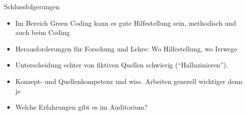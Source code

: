 \documentclass[10pt,aspectratio=169]{beamer}
\begin{document}
\begin{frame}{Schlussfolgerungen}
    \begin{itemize}
        \item Im Bereich Green Coding kann es gute Hilfestellung sein, methodisch und auch beim Coding
        \item Herausforderungen für Forschung und Lehre: Wo Hilfestellung, wo Irrwege
        \item Unterscheidung echter von fiktiven Quellen schwierig (``Halluzinieren'').
        \item Konzept- und Quellenkompetenz und wiss. Arbeiten generell wichtiger denn je
    \end{itemize}
    \vspace{1cm}
    \begin{itemize}
        \item  Welche Erfahrungen gibt es im Auditorium?
    \end{itemize}
\end{frame}
\end{document}
